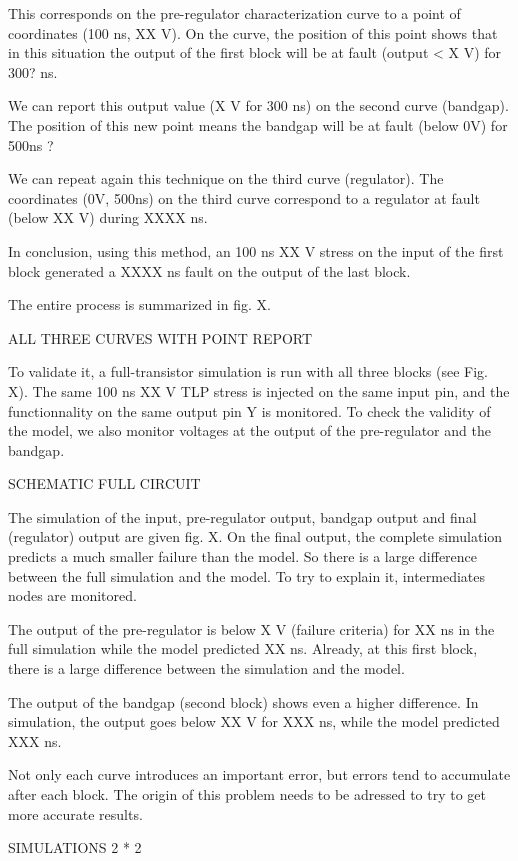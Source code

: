 This corresponds on the pre-regulator characterization curve to a point of coordinates (100 ns, XX V).
On the curve, the position of this point shows that in this situation the output of the first block will be at fault (output < X V) for 300? ns.

We can report this output value (X V for 300 ns) on the second curve (bandgap).
The position of this new point means the bandgap will be at fault (below 0V) for 500ns ?

We can repeat again this technique on the third curve (regulator).
The coordinates (0V, 500ns) on the third curve correspond to a regulator at fault (below XX V) during XXXX ns.

In conclusion, using this method, an 100 ns XX V stress on the input of the first block generated a XXXX ns fault on the output of the last block.

The entire process is summarized in fig. X.

ALL THREE CURVES WITH POINT REPORT

To validate it, a full-transistor simulation is run with all three blocks (see Fig. X).
The same 100 ns XX V TLP stress is injected on the same input pin, and the functionnality on the same output pin Y is monitored.
To check the validity of the model, we also monitor voltages at the output of the pre-regulator and the bandgap.

SCHEMATIC FULL CIRCUIT

The simulation of the input, pre-regulator output, bandgap output and final (regulator) output are given fig. X.
On the final output, the complete simulation predicts a much smaller failure than the model.
So there is a large difference between the full simulation and the model.
To try to explain it, intermediates nodes are monitored.

The output of the pre-regulator is below X V (failure criteria) for XX ns in the full simulation while the model predicted XX ns.
Already, at this first block, there is a large difference between the simulation and the model.

The output of the bandgap (second block) shows even a higher difference.
In simulation, the output goes below XX V for XXX ns, while the model predicted XXX ns.

Not only each curve introduces an important error, but errors tend to accumulate after each block.
The origin of this problem needs to be adressed to try to get more accurate results.

SIMULATIONS 2 * 2

